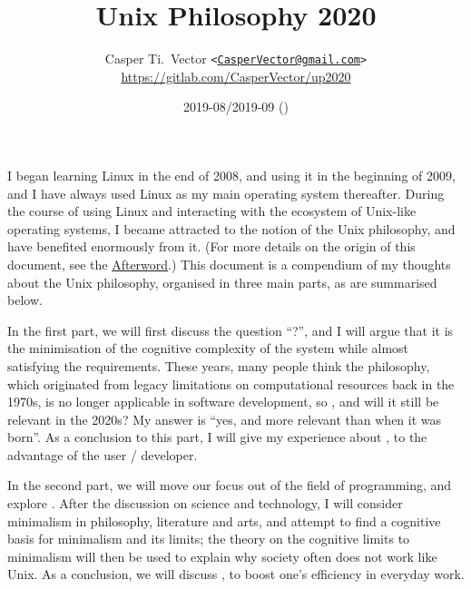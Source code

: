 \documentclass{article}
\begin{document}
\title{\textbf{Unix Philosophy 2020}}
\author{%
	Casper Ti.\ Vector
	\texttt{<\url{CasperVector@gmail.com}>}\\
	\url{https://gitlab.com/CasperVector/up2020}%
}
\date{2019-08/2019-09 (\docversion)}
\maketitle
\vspace{\baselineskip}
\tableofcontents


I began learning Linux in the end of 2008, and using it in the beginning of
2009, and I have always used Linux as my main operating system thereafter.
During the course of using Linux and interacting with the ecosystem of
Unix-like operating systems, I became attracted to the notion of the Unix
philosophy, and have benefited enormously from it.  (For more details on
the origin of this document, see the \hyperref[sec:afterword]{Afterword}.)
This document is a compendium of my thoughts about the Unix philosophy,
organised in three main parts, as are summarised below.

In the first part, we will first discuss the question ``?'', and I will argue that it is the minimisation
of the cognitive complexity of the system while almost satisfying the
requirements.  These years, many people think the philosophy, which originated
from legacy limitations on computational resources back in the 1970s, is no
longer applicable in software development, so , and will it still be relevant in the 2020s?  My answer is
``yes, and more relevant than when it was born''.  As a conclusion to this part,
I will give my experience about , to the advantage of the user / developer.

In the second part, we will move our focus out of the field of programming, and
explore .  After the discussion on
science and technology, I will consider minimalism in philosophy, literature
and arts, and attempt to find a cognitive basis for minimalism and its limits;
the theory on the cognitive limits to minimalism will then be used to explain
why society often does not work like Unix.  As a conclusion, we will discuss
,
to boost one's efficiency in everyday work.
\end{document}
